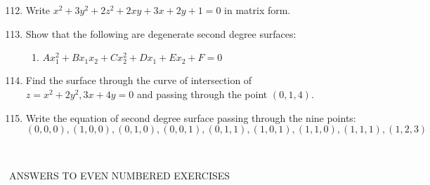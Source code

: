 \documentclass[11pt]{amsbook}
\begin{document}
	
\begin{enumerate}[label=\arabic*.]
\setcounter{enumi}{111}
	\item Write $x^2+3y^2+2z^2+2xy+3x+2y+1=0$ in matrix form.
	\item Show that the following are degenerate second degree surfaces:
		\begin{enumerate}[label=\alph*)]
				\item $Ax_1^2+Bx_1x_2+Cx_2^2+Dx_1+Ex_2+F=0$
		\end{enumerate}
	\item Find the surface through the curve of intersection of \\
		$z=x^2+2y^2, 3x+4y=0$ and passing through the point $(0,1,4)$.
	\item Write the equation of second degree surface passing through the nine points:\\
	 $(0,0,0), (1,0,0), (0,1,0), (0,0,1), (0,1,1), (1,0,1), (1,1,0), (1,1,1), (1,2,3) $
\end{enumerate}
~
\\
\begin{center}
ANSWERS TO EVEN NUMBERED EXERCISES
\end{center}
\end{document}
